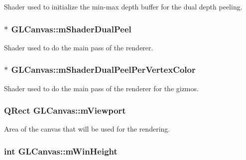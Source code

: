 Shader used to initialize the min-\/max depth buffer for the dual depth peeling. 

\hypertarget{class_g_l_canvas_a4321e3211f585a47a026f46de456267b}{
\subsubsection[{m\+Shader\+Dual\+Peel}]{$\ast$ G\+L\+Canvas\+::m\+Shader\+Dual\+Peel\hspace{0.3cm}{\ttfamily [private]}}}\label{class_g_l_canvas_a4321e3211f585a47a026f46de456267b}


Shader used to do the main pass of the renderer. 

\hypertarget{class_g_l_canvas_a78abb793d487793faf1e4870894264ee}{
\subsubsection[{m\+Shader\+Dual\+Peel\+Per\+Vertex\+Color}]{$\ast$ G\+L\+Canvas\+::m\+Shader\+Dual\+Peel\+Per\+Vertex\+Color\hspace{0.3cm}{\ttfamily [private]}}}\label{class_g_l_canvas_a78abb793d487793faf1e4870894264ee}


Shader used to do the main pass of the renderer for the gizmos. 

\hypertarget{class_g_l_canvas_add002deb2b2eccb3c7f04335d5f12782}{
\subsubsection[{m\+Viewport}]{\setlength{\rightskip}{0pt plus 5cm}Q\+Rect G\+L\+Canvas\+::m\+Viewport\hspace{0.3cm}{\ttfamily [private]}}}\label{class_g_l_canvas_add002deb2b2eccb3c7f04335d5f12782}


Area of the canvas that will be used for the rendering. 

\hypertarget{class_g_l_canvas_ac8ccc215c8038338702c314f369910e2}{
\subsubsection[{m\+Win\+Height}]{\setlength{\rightskip}{0pt plus 5cm}int G\+L\+Canvas\+::m\+Win\+Height\hspace{0.3cm}{\ttfamily [private]}}}\label{class_g_l_canvas_ac8ccc215c8038338702c314f369910e2}



